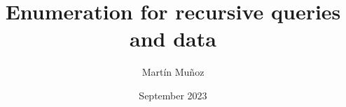 \documentclass[pdftex]{pucthesis}	%
\begin{document}

\title[Enumeration for recursive queries and data]
   {\bf Enumeration for recursive queries and data}       
\author[Martín Muñoz]{Martín Muñoz}

\address{Escuela de Ingenier\'ia\\
                   Pontificia Universidad Cat\'olica de Chile\\ 
                   Vicu\~na Mackenna 4860\\
                  Santiago, Chile\\
                  {\it Tel.\/} : 56 (2) 354-2000}

\subject                            {Computer Science}
\date                                 {September 2023}
\dedication                      {To my family}


\NoChapterPageNumber
{}
\maketitle




\end{document}
